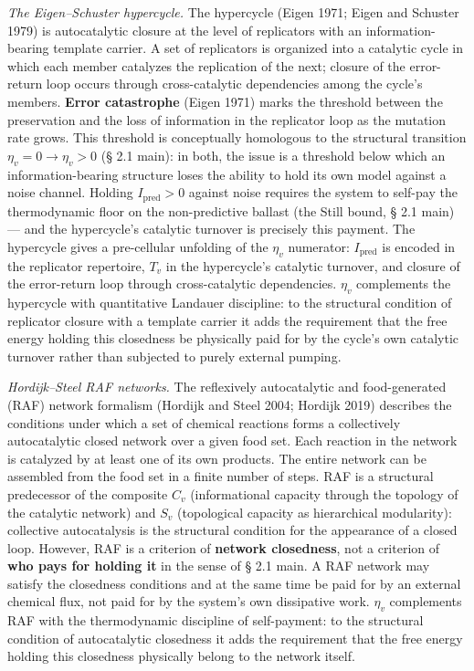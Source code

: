 \documentclass[pdflatex,sn-mathphys-ay]{sn-jnl}
\begin{document}
\emph{The Eigen--Schuster hypercycle.} The hypercycle (Eigen 1971; Eigen and Schuster 1979) is autocatalytic closure at the level of replicators with an information-bearing template carrier. A set of replicators is organized into a catalytic cycle in which each member catalyzes the replication of the next; closure of the error-return loop occurs through cross-catalytic dependencies among the cycle's members. \textbf{Error catastrophe} (Eigen 1971) marks the threshold between the preservation and the loss of information in the replicator loop as the mutation rate grows. This threshold is conceptually homologous to the structural transition \(\eta_v = 0 \to \eta_v > 0\) (§ 2.1 main): in both, the issue is a threshold below which an information-bearing structure loses the ability to hold its own model against a noise channel. Holding \(I_{\text{pred}} > 0\) against noise requires the system to self-pay the thermodynamic floor on the non-predictive ballast (the Still bound, § 2.1 main) --- and the hypercycle's catalytic turnover is precisely this payment. The hypercycle gives a pre-cellular unfolding of the \(\eta_v\) numerator: \(I_{\text{pred}}\) is encoded in the replicator repertoire, \(T_v\) in the hypercycle's catalytic turnover, and closure of the error-return loop through cross-catalytic dependencies. \(\eta_v\) complements the hypercycle with quantitative Landauer discipline: to the structural condition of replicator closure with a template carrier it adds the requirement that the free energy holding this closedness be physically paid for by the cycle's own catalytic turnover rather than subjected to purely external pumping.

\emph{Hordijk--Steel RAF networks.} The reflexively autocatalytic and food-generated (RAF) network formalism (Hordijk and Steel 2004; Hordijk 2019) describes the conditions under which a set of chemical reactions forms a collectively autocatalytic closed network over a given food set. Each reaction in the network is catalyzed by at least one of its own products. The entire network can be assembled from the food set in a finite number of steps. RAF is a structural predecessor of the composite \(C_v\) (informational capacity through the topology of the catalytic network) and \(S_v\) (topological capacity as hierarchical modularity): collective autocatalysis is the structural condition for the appearance of a closed loop. However, RAF is a criterion of \textbf{network closedness}, not a criterion of \textbf{who pays for holding it} in the sense of § 2.1 main. A RAF network may satisfy the closedness conditions and at the same time be paid for by an external chemical flux, not paid for by the system's own dissipative work. \(\eta_v\) complements RAF with the thermodynamic discipline of self-payment: to the structural condition of autocatalytic closedness it adds the requirement that the free energy holding this closedness physically belong to the network itself.
\end{document}
